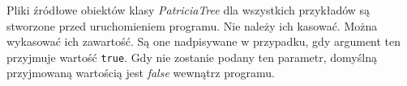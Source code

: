 \begin{enumerate}
    	    Pliki źródłowe obiektów klasy \emph{PatriciaTree} dla wszystkich przykładów są stworzone przed uruchomieniem programu. Nie należy ich kasować. Można wykasować ich zawartość. Są one nadpisywane w przypadku, gdy argument ten przyjmuje wartość \texttt{true}. Gdy nie zostanie podany ten parametr, domyślną przyjmowaną wartością jest \emph{false} wewnątrz programu.
    	\end{enumerate}